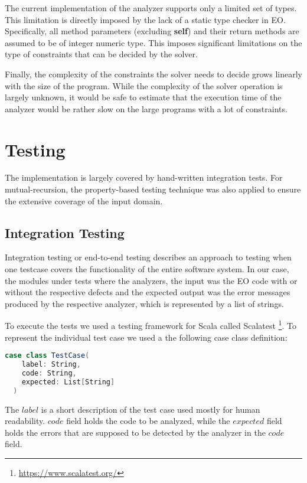 The current implementation of the analyzer supports only a limited set of types. This limitation is directly imposed by the lack of a static type checker in EO. Specifically, all method parameters (excluding \textbf{self}) and their return methods are assumed to be of integer numeric type. This imposes significant limitations on the type of constraints that can be decided by the solver.

Finally, the complexity of the constraints the solver needs to decide grows linearly with the size of the program. While the complexity of the solver operation is largely unknown, it would be safe to estimate that the execution time of the analyzer would be rather slow on the large programs with a lot of constraints.

\section{Testing}
\label{eval:testing}
The implementation is largely covered by hand-written integration tests. For mutual-recursion, the property-based testing technique \cite{property_based_testing} was also applied to ensure the extensive coverage of the input domain.

\subsection{Integration Testing}
\label{eval:integration_testing}
Integration testing or end-to-end testing \cite[Chapter 7]{testing} describes an approach to testing when one testcase covers the functionality of the entire software system. In our case, the modules under tests where the analyzers, the input was the EO code with or without the respective defects and the expected output was the error messages produced by the respective analyzer, which is represented by a list of strings.

To execute the tests we used a testing framework for Scala called Scalatest \footnote{\url{https://www.scalatest.org/}}. To represent the individual test case we used a the following case class definition:

\begin{lstlisting}[language=Scala]
case class TestCase(
    label: String,
    code: String,
    expected: List[String]
  )
    \end{lstlisting}

The $label$ is a short description of the test case used mostly for human readability. $code$ field holds the code to be analyzed, while the $expected$ field holds the errors that are supposed to be detected by the analyzer in the $code$ field.

